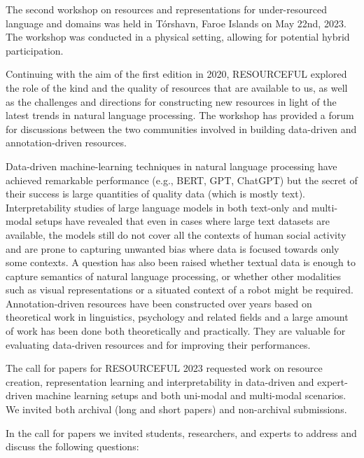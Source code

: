 The second workshop on resources and representations for under-resourced language and domains was held in Tórshavn, Faroe Islands on May 22nd, 2023.
The workshop was conducted in a physical setting, allowing for potential hybrid participation.
\vspace{2ex}

Continuing with the aim of the first edition in 2020, RESOURCEFUL explored the role of the kind and the quality of resources that are available to us, as well as the challenges and directions for constructing new resources in light of the latest trends in natural language processing.
The workshop has provided a forum for discussions between the two communities involved in building data-driven and annotation-driven resources. 
\vspace{2ex}

Data-driven machine-learning techniques in natural language processing have achieved remarkable performance (e.g., BERT, GPT, ChatGPT) but the secret of their success is large quantities of quality data (which is mostly text).
Interpretability studies of large language models in both text-only and multi-modal setups have revealed that even in cases where large text datasets are available, the models still do not cover all the contexts of human social activity and are prone to capturing unwanted bias where data is focused towards only some contexts.
\vspace{1ex}
A question has also been raised whether textual data is enough to capture semantics of natural language processing, or whether other modalities such as visual representations or a situated context of a robot might be required.
Annotation-driven resources have been constructed over years based on theoretical work in linguistics, psychology and related fields and a large amount of work has been done both theoretically and practically.
They are valuable for evaluating data-driven resources and for improving their performances.
\vspace{2ex}

The call for papers for RESOURCEFUL 2023 requested work on resource creation, representation learning and interpretability in data-driven and expert-driven machine learning setups and both uni-modal and multi-modal scenarios.
We invited both archival (long and short papers) and non-archival submissions.
\vspace{2ex}

In the call for papers we invited students, researchers, and experts to address and discuss the following questions:

